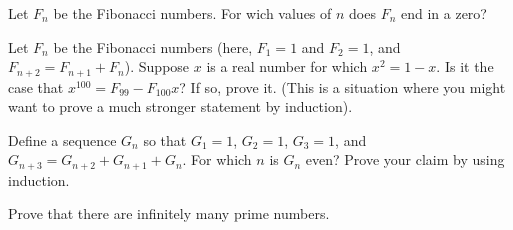 \documentclass[12pt]{midterm}
\begin{document}
\begin{exam}
\begin{problem}[360]
  Let $F_n$ be the Fibonacci numbers.  For wich values of $n$ does
  $F_n$ end in a zero?
\end{problem}

\begin{solution}\begin{solutiontext}
\end{solutiontext}\end{solution}

\begin{problem}[360]
  Let $F_n$ be the Fibonacci numbers (here, $F_1 = 1$ and $F_2 = 1$,
  and $F_{n+2} = F_{n+1} + F_{n}$).  Suppose $x$ is a real number for
  which $x^2 = 1 - x$.  Is it the case that $x^{100} = F_{99} -
  F_{100} x$?  If so, prove it.  (This is a situation where you might
  want to prove a much stronger statement by induction).
\end{problem}

\begin{solution}\begin{solutiontext}
\end{solutiontext}\end{solution}

\begin{problem}[360]
  Define a sequence $G_n$ so that $G_1 = 1$, $G_2 = 1$, $G_3 = 1$, and
  $G_{n+3} = G_{n+2} + G_{n+1} + G_{n}$.  For which $n$ is $G_n$ even?
  Prove your claim by using induction.
\end{problem}

\begin{solution}\begin{solutiontext}
\end{solutiontext}\end{solution}

\begin{problem}[360]
Prove that there are infinitely many prime numbers.
\end{problem}

\begin{solution}\begin{solutiontext}
\end{solutiontext}\end{solution}


\end{exam}
\end{document}
